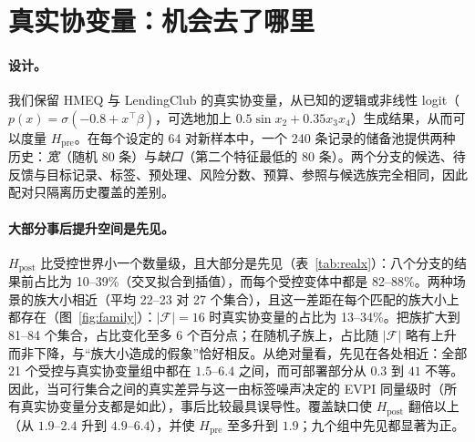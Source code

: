 \documentclass[runningheads]{llncs}
\begin{document}
\section{真实协变量：机会去了哪里}
\label{sec:realx}
\paragraph{设计。}我们保留 HMEQ 与 LendingClub 的真实协变量，从已知的逻辑或非线性 logit（$p(x)=\sigma(-0.8+x^\top\beta)$，可选地加上 $0.5\sin x_2+0.35x_3x_4$）生成结果，从而可以度量 $H_{\mathrm{pre}}$。在每个设定的 64 对新样本中，一个 240 条记录的储备池提供两种历史：\emph{宽}（随机 80 条）与\emph{缺口}（第二个特征最低的 80 条）。两个分支的候选、待反馈与目标记录、标签、预处理、风险分数、预算、参照与候选族完全相同，因此配对只隔离历史覆盖的差别。

\paragraph{大部分事后提升空间是先见。}$H_{\mathrm{post}}$ 比受控世界小一个数量级，且大部分是先见（表~\ref{tab:realx}）：八个分支的结果前占比为 10--39\%（交叉拟合到插值），而每个受控变体中都是 82--88\%。两种场景的族大小相近（平均 22--23 对 27 个集合），且这一差距在每个匹配的族大小上都存在（图~\ref{fig:family}）：$|\mathcal F|=16$ 时真实协变量的占比为 13--34\%。把族扩大到 81--84 个集合，占比变化至多 6 个百分点；在随机子族上，占比随 $|\mathcal F|$ 略有上升而非下降，与“族大小造成的假象”恰好相反。从绝对量看，先见在各处相近：全部 21 个受控与真实协变量组中都在 $1.5$--$6.4$ 之间，而可部署部分从 $0.3$ 到 $41$ 不等。因此，当可行集合之间的真实差异与这一由标签噪声决定的 EVPI 同量级时（所有真实协变量分支都是如此），事后比较最具误导性。覆盖缺口使 $H_{\mathrm{post}}$ 翻倍以上（从 $1.9$--$2.4$ 升到 $4.9$--$6.4$），并使 $H_{\mathrm{pre}}$ 至多升到 $1.9$；九个组中先见都显著为正。
\end{document}
